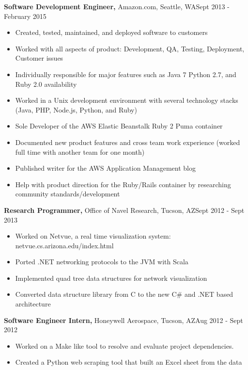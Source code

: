\documentclass{res}
\begin{document}
\begin{resume}
  {\bf Software Development Engineer,} Amazon.com, Seattle, WA\hfill Sept 2013 - February 2015
  \begin{itemize} \itemsep -2pt  %
    \item Created, tested, maintained, and deployed software to customers
    \item Worked with all aspects of product: Development, QA, Testing, Deployment, Customer issues
    \item Individually responsible for major features such as Java 7 Python 2.7, and Ruby 2.0 availability
    \item Worked in a Unix development environment with several technology stacks (Java, PHP, Node.js, Python, and Ruby)
    \item Sole Developer of the AWS Elastic Beanstalk Ruby 2 Puma container
    \item Documented new product features and cross team work experience (worked full time with another team for one month)
    \item Published writer for the AWS Application Management blog
    \item Help with product direction for the Ruby/Rails container by researching community standards/development
  \end{itemize}

  {\bf Research Programmer,} Office of Navel Research, Tucson, AZ\hfill Sept 2012 - Sept 2013
  \begin{itemize} \itemsep -2pt %
    \item Worked on Netvue, a real time visualization system: netvue.cs.arizona.edu/index.html
    \item Ported .NET networking protocols to the JVM with Scala
    \item Implemented quad tree data structures for network visualization
    \item Converted data structure library from C to the new C\# and .NET based architecture
  \end{itemize}

  {\bf Software Engineer Intern,} Honeywell Aerospace, Tucson, AZ\hfill Aug 2012 - Sept 2012
  \begin{itemize} \itemsep -2pt %
    \item Worked on a Make like tool to resolve and evaluate project dependencies.
    \item Created a Python web scraping tool that built an Excel sheet from the data
  \end{itemize}


\end{resume}
\end{document}
